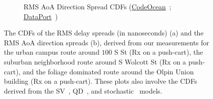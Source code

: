 \documentclass[10pt, twocolumn]{IEEEtran}
\begin{document}
{\begin{figure} [t]
\begin{subfigure}{0.496\linewidth}
        \caption{RMS AoA Direction Spread CDFs (\href{https://codeocean.com/capsule/9545863/tree}{CodeOcean}~\cite{CodeOcean}; \href{http://ieee-dataport.org/12580}{DataPort}~\cite{DataPort})}
        \label{F11b}
    \end{subfigure}
    \vspace{-5mm}
    \caption{The CDFs of the RMS delay spreads (in nanoseconds) (a) and the RMS AoA direction spreads (b), derived from our measurements for the urban campus route around $100$ S St (Rx on a push-cart), the suburban neighborhood route around S Wolcott St (Rx on a push-cart), and the foliage dominated route around the Olpin Union building (Rx on a push-cart). These plots also involve the CDFs derived from the SV~\cite{SV_Molisch}, QD~\cite{QDC_NIST}, and stochastic~\cite{Indoor60G} models.}
    \vspace{-6mm}
    \label{F11}
\end{figure}
\vspace{-3mm}

}
\end{document}
